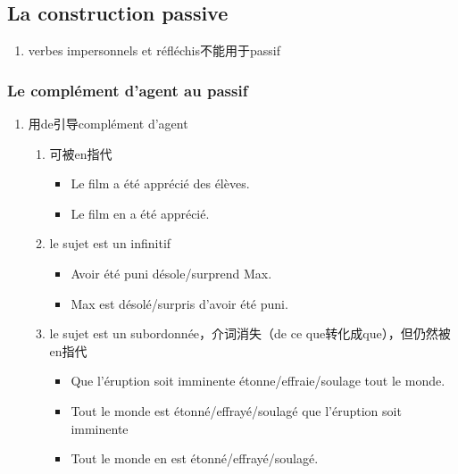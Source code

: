 \documentclass[UTF8]{report}
\begin{document}
\subsection{La construction passive}
\begin{enumerate}
    \item verbes impersonnels et réfléchis不能用于passif
\end{enumerate}
\subsubsection{Le complément d’agent au passif}
\begin{enumerate}
    \item 用de引导complément d’agent
    \begin{enumerate}
        \item 可被en指代
        \begin{itemize}
            \item Le film a été apprécié des élèves.
            \item Le film en a été apprécié.
        \end{itemize}
        \item le sujet est un infinitif
        \begin{itemize}
            \item Avoir été puni désole/surprend Max.
            \item Max est désolé/surpris d’avoir été puni.
        \end{itemize}
        \item le sujet est un subordonnée，介词消失（de ce que转化成que），但仍然被en指代
        \begin{itemize}
            \item Que l’éruption soit imminente étonne/effraie/soulage tout le monde.
            \item Tout le monde est étonné/effrayé/soulagé que l’éruption soit imminente
            \item Tout le monde en est étonné/effrayé/soulagé.
        \end{itemize}
        \begin{table}[H]
    \centering


\end{table}
\end{enumerate}
\end{enumerate}
\end{document}
